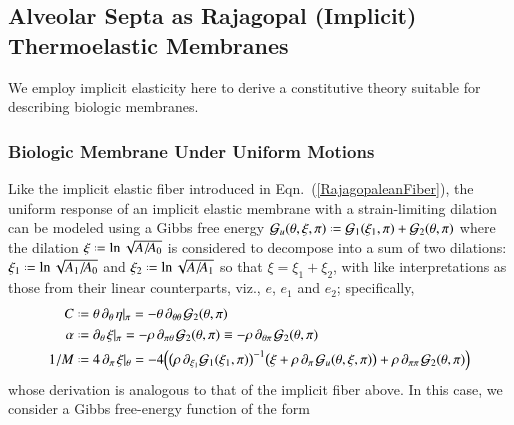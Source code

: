 \subsection{Alveolar Septa as Rajagopal (Implicit) Thermoelastic Membranes}

We employ implicit elasticity here to derive a constitutive theory suitable for describing biologic membranes.

\subsubsection{Biologic Membrane Under Uniform Motions}

Like the implicit elastic fiber introduced in Eqn.~(\ref{RajagopaleanFiber}), the uniform response of an implicit elastic membrane with a strain-limiting dilation can be modeled using a Gibbs free energy $\mathcal{G}_u (\theta , \xi , \pi ) \defeq \mathcal{G}_1 (\xi_1 ,\pi) + \mathcal{G}_2 (\theta , \pi)$ where the dilation $\xi \defeq \ln \sqrt{A / \! A_0}$ is considered to decompose into a sum of two dilations: $\xi_1 \defeq \ln \sqrt{A_1 / \! A_0}$ and $\xi_2 \defeq \ln \sqrt{A / \! A_1}$ so that $\xi = \xi_1 + \xi_2$, with like interpretations as those from their linear counterparts, viz., $e$, $e_1$ and $e_2$; specifically, 
\begin{subequations}
    \label{physicalFields2Dmembrane}
    \begin{align}
    C & \defeq \theta \, \partial_{\theta\,} \eta |_{\pi} = 
    -\theta \, \partial_{\theta\theta\,} \mathcal{G}_2(\theta , \pi)
    \label{specificHeat2Dmembrane} \\
    \alpha & \defeq \partial_{\theta\,} \xi |_{\pi} = 
    -\rho \, \partial_{\pi\theta\,} \mathcal{G}_2(\theta , \pi) \equiv
    -\rho \, \partial_{\theta\pi\,} \mathcal{G}_2(\theta , \pi)
    \label{thermalExpansion2Dmembrane} \\
    1/M & \defeq 4 \, \partial_{\pi\,} \xi |_{\theta} = -4 \Bigl(
    \bigl( \rho \, \partial_{\xi_1} \mathcal{G}_1 ( \xi_1, \pi ) \bigr)^{-1} 
    \bigl( \xi + \rho \, \partial_{\pi\,} \mathcal{G}_u (\theta , \xi , \pi ) \bigr) +
    \rho \, \partial_{\pi\pi\,} \mathcal{G}_2(\theta , \pi) \Bigr)
    \label{compliance2Dmembrane}
    \end{align}
\end{subequations}
whose derivation is analogous to that of the implicit fiber above.  In this case, we consider a Gibbs free-energy function of the form
